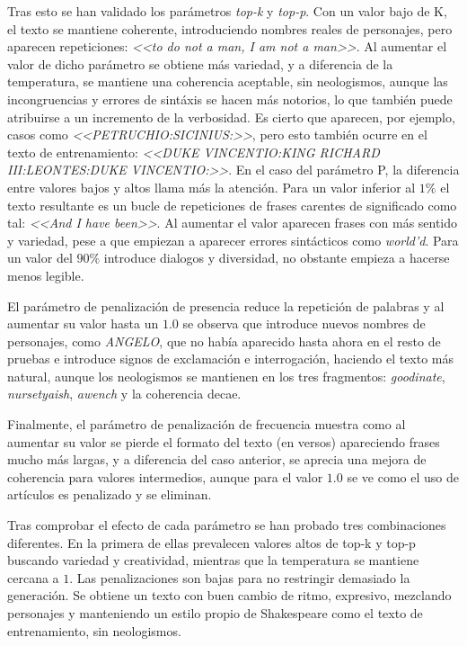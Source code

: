 \documentclass[11pt]{book}
\begin{document}
Tras esto se han validado los parámetros \textit{top-k} y \textit{top-p}. Con un valor bajo de K, el texto se mantiene coherente, introduciendo nombres reales de personajes, pero aparecen repeticiones: \textit{<<to do not a man, I am not a man>>}. Al aumentar el valor de dicho parámetro se obtiene más variedad, y a diferencia de la temperatura, se mantiene una coherencia aceptable, sin neologismos, aunque las incongruencias y errores de sintáxis se hacen más notorios, lo que también puede atribuirse a un incremento de la verbosidad. Es cierto que aparecen, por ejemplo, casos como \textit{<<PETRUCHIO:SICINIUS:>>}, pero esto también ocurre en el texto de entrenamiento: \textit{<<DUKE VINCENTIO:KING RICHARD III:LEONTES:DUKE VINCENTIO:>>}. En el caso del parámetro P, la diferencia entre valores bajos y altos llama más la atención. Para un valor inferior al $1\%$ el texto resultante es un bucle de repeticiones de frases carentes de significado como tal: \textit{<<And I have been>>}. Al aumentar el valor aparecen frases con más sentido y variedad, pese a que empiezan a aparecer errores sintácticos como \textit{world’d}. Para un valor del $90\%$ introduce dialogos y diversidad, no obstante empieza a hacerse menos legible.

El parámetro de penalización de presencia reduce la repetición de palabras y al aumentar su valor hasta un $1.0$ se observa que introduce nuevos nombres de personajes, como \textit{ANGELO}, que no había aparecido hasta ahora en el resto de pruebas e introduce signos de exclamación e interrogación, haciendo el texto más natural, aunque los neologismos se mantienen en los tres fragmentos: \textit{goodinate}, \textit{nursetyaish}, \textit{awench} y la coherencia decae.

Finalmente, el parámetro de penalización de frecuencia muestra como al aumentar su valor se pierde el formato del texto (en versos) apareciendo frases mucho más largas, y a diferencia del caso anterior, se aprecia una mejora de coherencia para valores intermedios, aunque para el valor $1.0$ se ve como el uso de artículos es penalizado y se eliminan. 

Tras comprobar el efecto de cada parámetro se han probado tres combinaciones diferentes. 
En la primera de ellas prevalecen valores altos de top-k y top-p buscando variedad y creatividad, mientras que la temperatura se mantiene cercana a $1$. Las penalizaciones son bajas para no restringir demasiado la generación. Se obtiene un texto con buen cambio de ritmo, expresivo, mezclando personajes y manteniendo un estilo propio de Shakespeare como el texto de entrenamiento, sin neologismos. 
\end{document}
